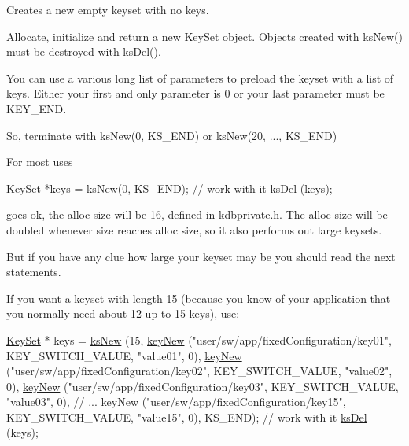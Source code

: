 Creates a new empty keyset with no keys. 

Allocate, initialize and return a new \hyperlink{classkdb_1_1KeySet}{Key\-Set} object.  Objects created with \hyperlink{group__keyset_ga671e1aaee3ae9dc13b4834a4ddbd2c3c}{ks\-New()} must be destroyed with \hyperlink{group__keyset_ga27e5c16473b02a422238c8d970db7ac8}{ks\-Del()}.

You can use a various long list of parameters to preload the keyset with a list of keys. Either your first and only parameter is 0 or your last parameter must be K\-E\-Y\-\_\-\-E\-N\-D.

So, terminate with ks\-New(0, K\-S\-\_\-\-E\-N\-D) or ks\-New(20, ..., K\-S\-\_\-\-E\-N\-D)

For most uses 
\begin{DoxyCode}
\hyperlink{classkdb_1_1KeySet_a4eac9850fa4f06c07a5306befc3e4377}{KeySet} *keys = \hyperlink{group__keyset_ga671e1aaee3ae9dc13b4834a4ddbd2c3c}{ksNew}(0, KS\_END);
\textcolor{comment}{// work with it}
\hyperlink{group__keyset_ga27e5c16473b02a422238c8d970db7ac8}{ksDel} (keys);
\end{DoxyCode}
 goes ok, the alloc size will be 16, defined in kdbprivate.\-h. The alloc size will be doubled whenever size reaches alloc size, so it also performs out large keysets.

But if you have any clue how large your keyset may be you should read the next statements.

If you want a keyset with length 15 (because you know of your application that you normally need about 12 up to 15 keys), use\-: 
\begin{DoxyCode}
\hyperlink{classkdb_1_1KeySet_a4eac9850fa4f06c07a5306befc3e4377}{KeySet} * keys = \hyperlink{group__keyset_ga671e1aaee3ae9dc13b4834a4ddbd2c3c}{ksNew} (15,
        \hyperlink{group__key_gad23c65b44bf48d773759e1f9a4d43b89}{keyNew} (\textcolor{stringliteral}{"user/sw/app/fixedConfiguration/key01"}, KEY\_SWITCH\_VALUE,
       \textcolor{stringliteral}{"value01"}, 0),
        \hyperlink{group__key_gad23c65b44bf48d773759e1f9a4d43b89}{keyNew} (\textcolor{stringliteral}{"user/sw/app/fixedConfiguration/key02"}, KEY\_SWITCH\_VALUE,
       \textcolor{stringliteral}{"value02"}, 0),
        \hyperlink{group__key_gad23c65b44bf48d773759e1f9a4d43b89}{keyNew} (\textcolor{stringliteral}{"user/sw/app/fixedConfiguration/key03"}, KEY\_SWITCH\_VALUE,
       \textcolor{stringliteral}{"value03"}, 0),
        \textcolor{comment}{// ...}
        \hyperlink{group__key_gad23c65b44bf48d773759e1f9a4d43b89}{keyNew} (\textcolor{stringliteral}{"user/sw/app/fixedConfiguration/key15"}, KEY\_SWITCH\_VALUE,
       \textcolor{stringliteral}{"value15"}, 0),
        KS\_END);
\textcolor{comment}{// work with it}
\hyperlink{group__keyset_ga27e5c16473b02a422238c8d970db7ac8}{ksDel} (keys);
\end{DoxyCode}


